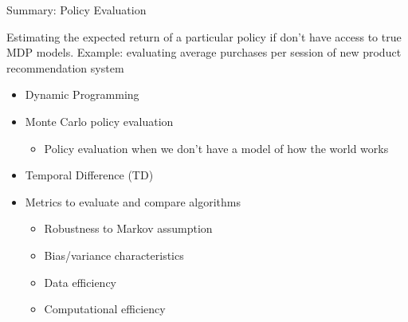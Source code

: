 \begin{frame}[c]{Summary: Policy Evaluation}
	
	Estimating the expected return of a particular policy if don’t have access to true MDP models. Example: evaluating average purchases per session of new product recommendation system
	
	\begin{itemize}
		\item Dynamic Programming
		\item Monte Carlo policy evaluation
		\begin{itemize}
			\item Policy evaluation when we don’t have a model of how the world works
		\end{itemize}
		\item Temporal Difference (TD)
		\item Metrics to evaluate and compare algorithms
		\begin{itemize}
			\item Robustness to Markov assumption
			\item Bias/variance characteristics
			\item Data efficiency
			\item Computational efficiency
		\end{itemize}
	\end{itemize}

	
\end{frame}




